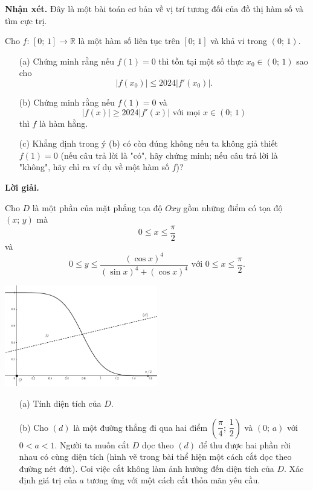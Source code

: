 \textbf{Nhận xét. }Đây là một bài toán cơ bản về vị trí tương đối của đồ thị hàm số và tìm cực trị.

\begin{tcolorbox}[title=\textbf{Bài toán B.4.},breakable]
    Cho $f:\,[0;\,1] \to \mathbb{R}$ là một hàm số liên tục trên $[0;\,1]$ và khả vi trong $(0;\,1)$.

    \begin{enumerate}
        \item[(a)] {Chứng minh rằng nếu $f(1) = 0$ thì tồn tại một số thực $x_0 \in (0;\,1)$ sao cho $$|f(x_0)| \leq 2024|f'(x_0)|.$$}
        \item[(b)] {Chứng minh rằng nếu $f(1) = 0$ và $$|f(x)| \geq 2024|f'(x)|\text{ với mọi }x \in (0;\,1)$$ thì $f$ là hàm hằng.}
        \item[(c)] {Khẳng định trong ý (b) có còn đúng không nếu ta không giả thiết $f(1) = 0$ (nếu câu trả lời là "có", hãy chứng minh; nếu câu trả lời là "không", hãy chỉ ra ví dụ về một hàm số $f$)?}  
    \end{enumerate}
\end{tcolorbox}

\textbf{Lời giải. }

\begin{tcolorbox}[title=\textbf{Bài toán B.5.},breakable]
    Cho $D$ là một phần của mặt phẳng tọa độ $Oxy$ gồm những điểm có tọa độ $(x;\,y)$ mà $$0 \leq x \leq \dfrac{\pi}{2}$$ và $$0 \leq y \leq \dfrac{(\cos x)^4}{(\sin x)^4 + (\cos x)^4}\text{ với }0 \leq x \leq \dfrac{\pi}{2}.$$
    \begin{center}
        \includegraphics[width=0.5\textwidth]{Figures/05.png}
    \end{center}
    \begin{enumerate}
        \item[(a)] {Tính diện tích của $D$.}
        \item[(b)] {Cho $(d)$ là một đường thẳng đi qua hai điểm $\left(\dfrac{\pi}{4};\,\dfrac{1}{2}\right)$ và $(0;\,a)$ với $0 < a < 1$. Người ta muốn cắt $D$ dọc theo $(d)$ để thu được hai phần rời nhau có cùng diện tích (hình vẽ trong bài thể hiện một cách cắt dọc theo đường nét đứt). Coi việc cắt không làm ảnh hưởng đến diện tích của $D$. Xác định giá trị của $a$ tương ứng với một cách cắt thỏa mãn yêu cầu.} 
    \end{enumerate}
\end{tcolorbox}

